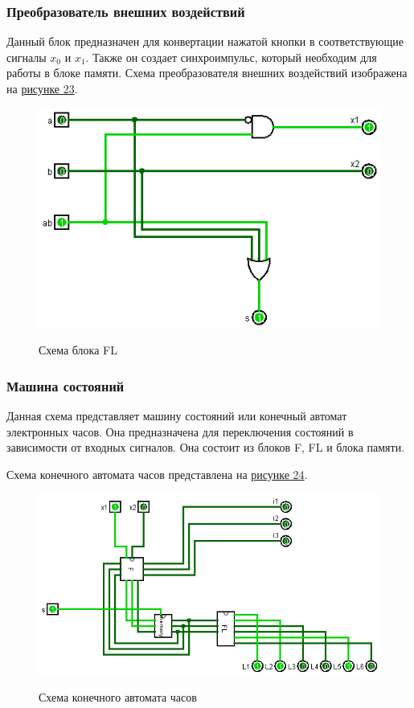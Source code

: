 \documentclass[10pt,a4paper,final]{article} %
\begin{document}
\subsubsection{Преобразователь внешних воздействий}
Данный блок предназначен для конвертации нажатой кнопки в соответствующие сигналы $x_0$ и $x_1$. Также он создает синхроимпульс, который необходим для работы в блоке памяти.
Схема преобразователя внешних воздействий изображена на \hyperref[BC]{рисунке 23}.
\begin{figure}[htpb]
	\centering
	\includegraphics[scale=0.4]{logisim/img/BC.png}
	\label{BC} 
	\caption{Схема блока FL}
\end{figure}

\subsubsection{Машина состояний}
Данная схема представляет машину состояний или конечный автомат электронных часов. Она предназначена для переключения состояний в зависимости от входных сигналов. Она состоит из блоков F, FL и блока памяти.

Схема конечного автомата часов представлена на \hyperref[state machine]{рисунке 24}.
\begin{figure}[htpb]
	\centering
	\includegraphics[scale=0.4]{logisim/img/state machine.png}
	\label{state machine} 
	\caption{Схема конечного автомата часов }
\end{figure}
\end{document}
